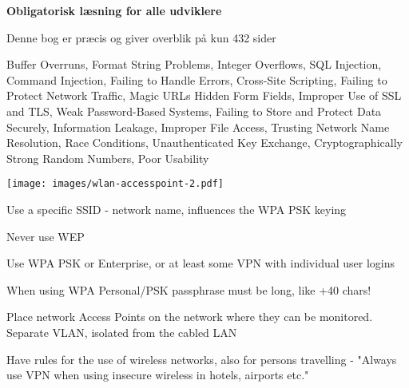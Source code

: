 \documentclass[Screen16to9,17pt]{foils}
\begin{document}
\begin{list1}
\item {\bf Obligatorisk læsning for alle udviklere}
\item Denne bog er præcis og giver overblik på kun 432 sider
\item Buffer Overruns, Format String Problems, Integer Overflows, SQL Injection, Command Injection,
Failing to Handle Errors, Cross-Site Scripting, Failing to Protect Network Traffic, Magic URLs Hidden Form Fields,
Improper Use of SSL and TLS, Weak Password-Based Systems, Failing to Store and Protect Data Securely, Information
Leakage, Improper File Access, Trusting Network Name Resolution, Race Conditions, Unauthenticated Key Exchange, Cryptographically Strong Random Numbers, Poor Usability
\end{list1}



\begin{minipage}{10cm}
\texttt{[image: images/wlan-accesspoint-2.pdf]}
\end{minipage}
\begin{minipage}{\linewidth-10cm}
\begin{list2}
\item Use a specific SSID - network name, influences the WPA PSK keying
\item Never use WEP
\item Use WPA PSK or Enterprise, or at least some VPN with individual user logins

\item When using WPA Personal/PSK passphrase must be long, like +40 chars!
\item Place network Access Points on the network where they can be monitored. Separate VLAN, isolated from the cabled LAN
\item Have rules for the use of wireless networks, also for persons travelling - "Always use VPN when using insecure wireless in hotels, airports etc."
\end{list2}
\end{minipage}


\myquestionspage
\end{document}
